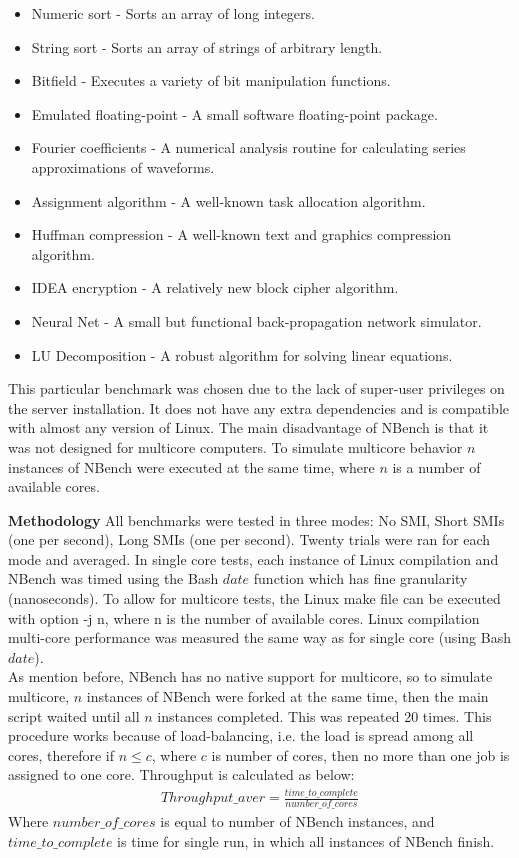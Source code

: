 \documentclass{IEEEtran}
\begin{document}
\begin{itemize}
  \item Numeric sort - Sorts an array of long integers.
  \item String sort - Sorts an array of strings of arbitrary length.
  \item Bitfield - Executes a variety of bit manipulation functions.
  \item Emulated floating-point - A small software floating-point package.
  \item Fourier coefficients - A numerical analysis routine for calculating series approximations of waveforms.
  \item Assignment algorithm - A well-known task allocation algorithm.
  \item Huffman compression - A well-known text and graphics compression algorithm.
  \item IDEA encryption - A relatively new block cipher algorithm.
  \item Neural Net - A small but functional back-propagation network simulator.
  \item LU Decomposition - A robust algorithm for solving linear equations.
\end{itemize}

This particular benchmark was chosen due to the lack of super-user privileges on the server installation. It does not have any extra dependencies and is compatible with almost any version of Linux. The main disadvantage of NBench is that it was not designed for multicore computers. To simulate multicore behavior $n$ instances of NBench were executed at the same time, where $n$ is a number of available cores.

\textbf{Methodology}
All benchmarks were tested in three modes: No SMI, Short SMIs (one per second), Long SMIs (one per second). Twenty trials were ran for each mode and averaged. In single core tests, each instance of Linux compilation and NBench was timed using the Bash $date$ function which has fine granularity (nanoseconds). To allow for multicore tests, the Linux make file can be executed with option -j n, where n is the number of available cores. Linux compilation multi-core performance was measured the same way as for single core (using Bash $date$).\\
\indent As mention before, NBench has no native support for multicore, so to simulate multicore, $n$ instances of NBench were forked at the same time, then the main script waited until all $n$ instances completed. This was repeated 20 times. This procedure works because of load-balancing, i.e. the load is spread among all cores, therefore if $n \le c$, where $c$ is number of cores, then no more than one job is assigned to one core. Throughput is calculated as below:\\
\begin{eqnarray}
Throughput\_aver=\frac{time\_to\_complete}{number\_of\_cores}
\end{eqnarray}
Where $number\_of\_cores$ is equal to number of NBench instances, and $time\_to\_complete$ is time for single run, in which all instances of NBench finish.\\
\end{document}
